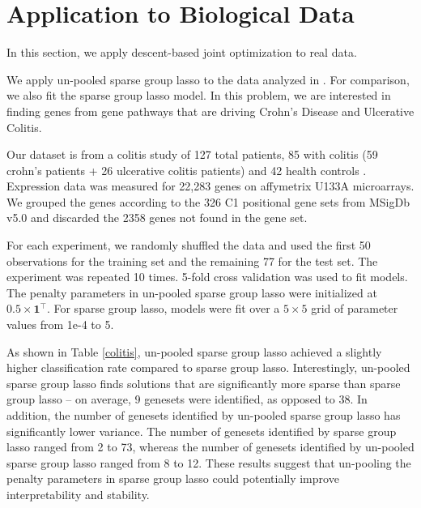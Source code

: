 \documentclass[10pt,letterpaper]{article}
\begin{document}

\section{Application to Biological Data}
In this section, we apply descent-based joint optimization to real data.

We apply un-pooled sparse group lasso to the data analyzed in \citet{simon2013sparse}. For comparison, we also fit the sparse group lasso model. In this problem, we are interested in finding genes from gene pathways that are driving Crohn's Disease and Ulcerative Colitis.

Our dataset is from a colitis study of 127 total patients, 85 with colitis (59 crohn's patients + 26 ulcerative colitis patients) and 42 health controls \citep{burczynski2006molecular}. Expression data was measured for 22,283 genes on affymetrix U133A microarrays. We grouped the genes according to the 326 C1 positional gene sets from MSigDb v5.0 \citep{subramanian2005gene} and discarded the 2358 genes not found in the gene set.

For each experiment, we randomly shuffled the data and used the first 50 observations for the training set and the remaining 77 for the test set. The experiment was repeated 10 times. 5-fold cross validation was used to fit models. The penalty parameters in un-pooled sparse group lasso were initialized at $0.5 \times \boldsymbol 1^\top$. For sparse group lasso, models were fit over a $5 \times 5$ grid of parameter values from 1e-4 to 5.

As shown in Table \ref{colitis}, un-pooled sparse group lasso achieved a slightly higher classification rate compared to sparse group lasso. Interestingly, un-pooled sparse group lasso finds solutions that are significantly more sparse than sparse group lasso -- on average, 9 genesets were identified, as opposed to 38. In addition, the number of genesets identified by un-pooled sparse group lasso has significantly lower variance. The number of genesets identified by sparse group lasso ranged from 2 to 73, whereas the number of genesets identified by un-pooled sparse group lasso ranged from 8 to 12. These results suggest that un-pooling the penalty parameters in sparse group lasso could potentially improve interpretability and stability.
\end{document}
